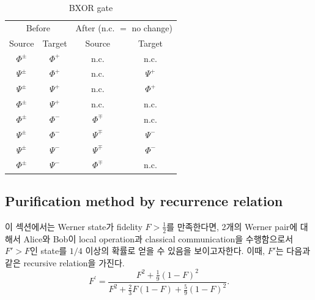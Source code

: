 \documentclass[
]{kaohandt}
\begin{document}
\begin{table}
\begin{tabular}{cccc}
    \multicolumn{2}{c}{ Before } & \multicolumn{2}{c}{ After (n.c. $=$ no change) } \\
    Source & Target & Source & Target \\
    \hline$\Phi^{ \pm}$ & $\Phi^{+}$ & n.c. & n.c. \\
    $\Psi^{ \pm}$ & $\Phi^{+}$ & n.c. & $\Psi^{+}$ \\
    $\Psi^{ \pm}$ & $\Psi^{+}$ & n.c. & $\Phi^{+}$ \\
    $\Phi^{ \pm}$ & $\Psi^{+}$ & n.c. & n.c. \\
    $\Phi^{ \pm}$ & $\Phi^{-}$ & $\Phi^{\mp}$ & n.c. \\
    $\Psi^{ \pm}$ & $\Phi^{-}$ & $\Psi^{\mp}$ & $\Psi^{-}$ \\
    $\Psi^{ \pm}$ & $\Psi^{-}$ & $\Psi^{\mp}$ & $\Phi^{-}$ \\
    $\Phi^{ \pm}$ & $\Psi^{-}$ & $\Phi^{\mp}$ & n.c.
\end{tabular}
\caption{BXOR gate}
\label{table:BXOR}
\end{table}


\subsection{Purification method by recurrence relation}
이 섹션에서는 Werner state가 fidelity $F > \frac{1}{2}$를 만족한다면, 2개의 Werner pair에 대해서 Alice와 Bob이 local operation과 classical communication을 수행함으로서 $F'>F$인 state를 $1/4$ 이상의 확률로 얻을 수 있음을 보이고자한다. 이때, $F'$는 다음과 같은 recursive relation을 가진다.
\begin{equation}
    F^{\prime}=\frac{F^2+\frac{1}{9}(1-F)^2}{F^2+\frac{2}{3} F(1-F)+\frac{5}{9}(1-F)^2} .
\end{equation}
\end{document}
